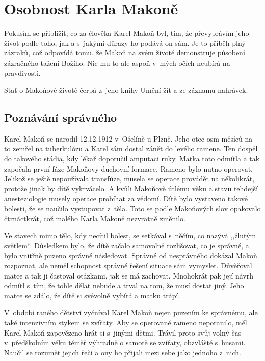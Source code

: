 \chapter{Osobnost Karla Makoně}


Pokusím se přiblížit, co za člověka Karel Makoň byl, tím, že převyprávím jeho
život podle toho, jak a s~jakými důrazy ho podává on sám. Je to příběh plný
zázraků, což odpovídá tomu, že Makoň na svém životě demonstruje působení
zázračného tažení Božího. Nic mu to ale aspoň v~mých očích neubírá na
pravdivosti.

Stať o Makoňově životě čerpá z~jeho knihy Umění žít\cite{KaMaUZ} a ze záznamů nahrávek.

\section{Poznávání správného}

Karel Makoň se narodil 12.12.1912 v~Ošelíně u Plzně. Jeho otec osm měsíců na
to zemřel na tuberkulózu a Karel sám dostal zánět do levého ramene. Ten dospěl
do takového stádia, kdy lékař doporučil amputaci ruky. Matka toto odmítla a tak
započala první fáze Makoňovy duchovní formace. Rameno bylo nutno operovat.
Jelikož se ještě nepoužívala transfúze, musela se operace provádět na
několikrát, protože jinak by dítě vykrvácelo. A kvůli Makoňově útlému věku a
stavu tehdejší anesteziologie musely operace probíhat za vědomí. Dítě bylo
vystaveno takové bolesti, že se naučilo vystupovat z~těla. Toto se podle
Makoňových slov opakovalo čtrnáctkrát, což malého Karla Makoně nezvratně
změnilo.

Ve stavech mimo tělo, kdy necítil bolest, se setkával s~něčím, co nazývá
,,žlutým světlem``.  Důsledkem bylo, že dítě začalo samovolně rozlišovat, co je
  správné, a bylo vnitřně puzeno správné následovat. Správné od nesprávného dokázal
Makoň rozpoznat, ale neměl schopnost správné řešení situace sám vymyslet. Důvěřoval
matce a tak ji častoval otázkami, jak se má zachovat. Mnohokrát pak její návrh
odmítl s~tím, že tohle dělat nebude a trval na tom, že musí dostat jiný. Jeho
matce se zdálo, že dítě si svévolně vybírá a matku trápí.

V~období raného dětství vyčníval Karel Makoň nejen puzením ke správnému, ale
také intenzivním stykem se zvířaty. Aby se operované rameno neporanilo, měl
Karel Makoň zapovězeno hrát si s~jinými dětmi. Trávil proto svůj volný čas
v~předškolním věku téměř výhradně o samotě se zvířaty, obzvláště s~husami.
Naučil se rozumět jejich řeči a ony ho přijali mezi sebe jako jednoho z~nich.

